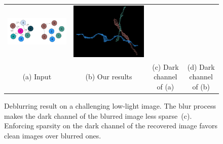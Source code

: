 \documentclass[10pt,twocolumn,letterpaper]{article}
\begin{document}
\begin{figure}[t]
\begin{minipage}{\textwidth}
\begin{center}
\begin{tabular}{cccc}
				\FigureShift \includegraphics[width=\FigureWidth]{figures/schema/multicut-graph.png}&
				\FigureShift \includegraphics[width=\FigureWidth]{figures/schema/post-multicut.png}\\
				\figureShift (a) Input & \FigureShift (b)  Our results & \FigureShift(c) Dark channel of (a) & \FigureShift (d) Dark channel of (b)\\
			\end{tabular}
		\end{center}
		\vspace{-3mm}
		\caption{Deblurring result on a challenging low-light image. The blur process makes the dark channel of the blurred image less sparse~(c). Enforcing sparsity on the dark channel of the recovered image favors clean images over blurred ones.}
		\label{fig:teaser}
	\end{minipage}
\end{figure}
\end{document}

